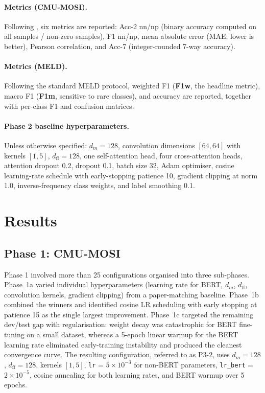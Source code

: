 \documentclass[11pt,twocolumn]{article}
\begin{document}
\paragraph{Metrics (CMU-MOSI).} Following \citet{yu2021selfmm}, six metrics are reported: Acc-2 nn/np (binary accuracy computed on all samples / non-zero samples), F1 nn/np, mean absolute error (MAE; lower is better), Pearson correlation, and Acc-7 (integer-rounded 7-way accuracy).

\paragraph{Metrics (MELD).} Following the standard MELD protocol, weighted F1 (\textbf{F1w}, the headline metric), macro F1 (\textbf{F1m}, sensitive to rare classes), and accuracy are reported, together with per-class F1 and confusion matrices.

\paragraph{Phase 2 baseline hyperparameters.} Unless otherwise specified: $d_m = 128$, convolution dimensions $[64, 64]$ with kernels $[1, 5]$, $d_{\text{ff}} = 128$, one self-attention head, four cross-attention heads, attention dropout 0.2, dropout 0.1, batch size 32, Adam optimiser, cosine learning-rate schedule with early-stopping patience 10, gradient clipping at norm 1.0, inverse-frequency class weights, and label smoothing 0.1.

\section{Results}
\label{sec:results}

\subsection{Phase 1: CMU-MOSI}

Phase 1 involved more than 25 configurations organised into three sub-phases. Phase~1a varied individual hyperparameters (learning rate for BERT, $d_m$, $d_{\text{ff}}$, convolution kernels, gradient clipping) from a paper-matching baseline. Phase~1b combined the winners and identified cosine LR scheduling with early stopping at patience 15 as the single largest improvement. Phase~1c targeted the remaining dev/test gap with regularisation: weight decay was catastrophic for BERT fine-tuning on a small dataset, whereas a 5-epoch linear warmup for the BERT learning rate eliminated early-training instability and produced the cleanest convergence curve. The resulting configuration, referred to as P3-2, uses $d_m = 128$, $d_{\text{ff}} = 128$, kernels $[1, 5]$, \texttt{lr} = $5 \times 10^{-3}$ for non-BERT parameters, \texttt{lr\_bert} = $2 \times 10^{-5}$, cosine annealing for both learning rates, and BERT warmup over 5 epochs.
\end{document}
